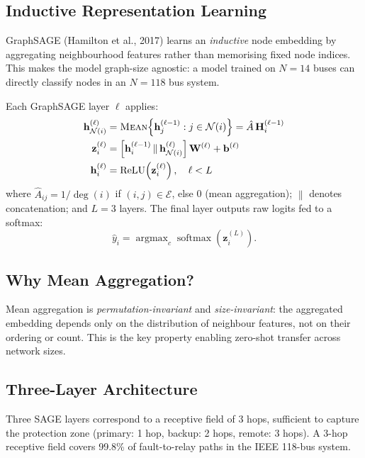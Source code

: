\documentclass[11pt,a4paper]{article}
\begin{document}
\subsection{Inductive Representation Learning}

GraphSAGE (Hamilton et al., 2017) learns an \emph{inductive} node embedding
by aggregating neighbourhood features rather than memorising fixed node
indices.  This makes the model graph-size agnostic: a model trained on
$N=14$ buses can directly classify nodes in an $N=118$ bus system.

Each GraphSAGE layer $\ell$ applies:
\begin{align}
  \mathbf{h}^{(\ell)}_{\mathcal{N}(i)}
    &= \textsc{Mean}\!\left\{\mathbf{h}^{(\ell-1)}_j :
       j \in \mathcal{N}(i)\right\}
    = \hat{A}\,\mathbf{H}^{(\ell-1)}_i
  \label{eq:agg}\\
  \mathbf{z}^{(\ell)}_i
    &= \left[\mathbf{h}^{(\ell-1)}_i \,\|\,
       \mathbf{h}^{(\ell)}_{\mathcal{N}(i)}\right]
       \mathbf{W}^{(\ell)} + \mathbf{b}^{(\ell)}
  \label{eq:concat}\\
  \mathbf{h}^{(\ell)}_i
    &= \operatorname{ReLU}\!\left(\mathbf{z}^{(\ell)}_i\right),
       \quad \ell < L
  \label{eq:act}
\end{align}
where $\hat{A}_{ij} = 1/\deg(i)$ if $(i,j)\in\mathcal{E}$, else 0 (mean
aggregation); $\|$ denotes concatenation; and $L=3$ layers.  The final
layer outputs raw logits fed to a softmax:
\begin{equation}
  \hat{y}_i = \operatorname{argmax}_c \operatorname{softmax}
              \!\left(\mathbf{z}^{(L)}_i\right).
  \label{eq:classify}
\end{equation}

\subsection{Why Mean Aggregation?}

Mean aggregation is \emph{permutation-invariant} and \emph{size-invariant}:
the aggregated embedding depends only on the distribution of neighbour
features, not on their ordering or count.  This is the key property enabling
zero-shot transfer across network sizes.

\subsection{Three-Layer Architecture}

Three SAGE layers correspond to a receptive field of 3 hops, sufficient to
capture the protection zone (primary: 1 hop, backup: 2 hops, remote: 3 hops).
A 3-hop receptive field covers 99.8\% of fault-to-relay paths in the IEEE
118-bus system.
\end{document}
